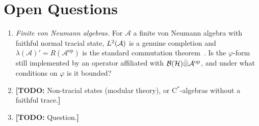 \documentclass[12pt]{article}
\newcommand{\todo}[1]{\textcolor{\mysubcolor}{\small\textbf{[TODO:} #1\textbf{]}}}
\newcommand{\alg}{\mathcal{A}}             %
\newcommand{\hilb}{\mathcal{H}}            %
\newcommand{\bdd}[1]{\mathcal{B}\br{#1}}   %
\newcommand{\op}{^{\mathrm{op}}}           %
\newcommand{\Ltwo}{L^2\br{\alg}}           %
\begin{document}
\section{Open Questions}
\label{sec:open}

\begin{enumerate}[label=(Q\arabic*)]
  \item \emph{Finite von Neumann algebras.} For \(\alg\) a finite von Neumann
    algebra with faithful normal tracial state, \(\Ltwo\) is a genuine completion
    and \(\lambda(\alg)' = R(\alg\op)\) is the standard commutation
    theorem~\cite{AnantharamanPopa}. Is the \(\varphi\)-form still implemented by an
    operator affiliated with \(\bdd{\hilb} \bar{\tensor} \alg\op\), and under
    what conditions on \(\varphi\) is it bounded?
  \item \todo{Non-tracial states (modular theory), or C\(^*\)-algebras without
    a faithful trace.}
  \item \todo{Question.}
\end{enumerate}




% 
\end{document}
